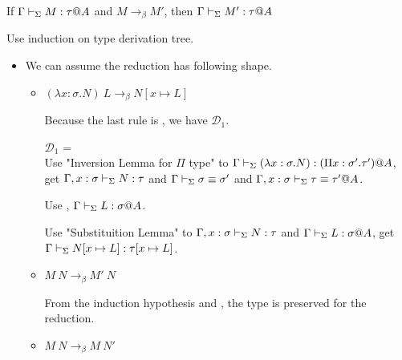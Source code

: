 \begin{theorem}
	If $\G\V M:\tau@A$ and $M \longrightarrow_{\beta} M'$, then $\G\V M':\tau@A$\\
\end{theorem}

Use induction on type derivation tree.

\begin{itemize}
	\newcommand{\LB}{\longrightarrow_{\beta}}
			
	\item \TApp
	      	      	      
	      We can assume the reduction has following shape.
	      	      	      
	      \begin{itemize}
	      	\item $(\lambda x:\sigma.N)\ L \LB N[x\mapsto L]$
	      	      	      	      	      	      
	      	      Because the last rule is \TApp, we have $\mathcal{D}_1$.
	      	      	      	      	      	      
	      	      $\mathcal{D}_1$ = 
	      	      { \andalso {}} \\
	      	      	      	      	      	      
	      	      Use "Inversion Lemma for $\Pi$ type" to $\Gamma \vdash_\Sigma (\lambda x:\sigma.N) : (\Pi x:\sigma'.\tau')@A$,\\
	      	      get $\Gamma, x:\sigma \vdash_\Sigma N:\tau$ and $\Gamma \vdash_\Sigma \sigma \equiv \sigma'$ and $\Gamma ,x:\sigma \vdash_\Sigma \tau \equiv \tau'@A$.
	      	      	      	      	      	      
	      	      Use \TConv, $\Gamma \vdash_\Sigma L:\sigma @A$.
	      	      	      	      	      	      
	      	      Use "Substituition Lemma" to $\Gamma, x:\sigma \vdash_\Sigma N:\tau$ and $\Gamma \vdash_\Sigma L:\sigma @A$, get $\Gamma \vdash_\Sigma N[x\mapsto L]:\tau[x\mapsto L]$.
	      	      	      	      	      	      
	      	\item $M\ N \LB M'\ N$
	      	      	      	      	      	      
	      	      From the induction hypothesis and \TApp, the type is preserved for the reduction.
	      	\item $M\ N \LB M\ N'$
	      	      	      	      	      	      

\end{itemize}
\end{itemize}
